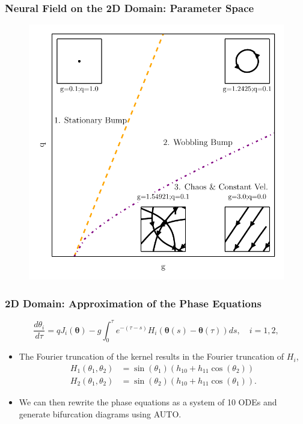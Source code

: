 \documentclass{beamer}
\newcommand{\q}{\boldsymbol{\theta}}
\begin{document}
\begin{frame}
\frametitle{Neural Field on the 2D Domain: Parameter Space}
\begin{figure}
 \includegraphics[width=.6\textwidth]{twod_full_auto_5terms_2par4.pdf}
\end{figure}
\end{frame}

\begin{frame}
 \frametitle{2D Domain: Approximation of the Phase Equations}
  \begin{equation*}
\frac{d\theta_i}{d\tau} = qJ_i(\q) -g\int_0^\tau e^{-(\tau-s)} H_i(\q(s)-\q(\tau))ds, \quad i=1,2,
\end{equation*}
\begin{itemize}
 \item<1->  The Fourier truncation of the kernel results in the Fourier truncation of $H_i$,
\begin{equation*}
\begin{split}
 H_1(\theta_1,\theta_2) &=  \sin(\theta_1)(h_{10} + h_{11}\cos(\theta_2))\\
 H_2(\theta_1,\theta_2) &=  \sin(\theta_2)(h_{10} + h_{11}\cos(\theta_1)).
 \end{split}
\end{equation*}
\item<2-> We can then rewrite the phase equations as a system of 10 ODEs and generate bifurcation diagrams using AUTO.
\end{itemize}

\end{frame}

\end{document}
